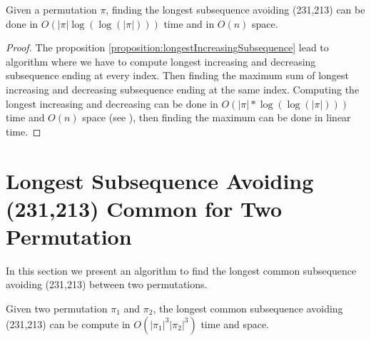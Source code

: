 \documentclass[a4paper]{llncs}
\newcommand{\ptext}{\pi}
\newcounter{num}
\begin{document}
	\begin{proposition}
	Given a permutation $\pi$,
	finding the longest subsequence avoiding (231,213)
	can be done in $O(|\ptext|\log(\log(|\ptext|)))$ time and in $O(n)$ space.
	\end{proposition}

	\begin{proof}
	The proposition \ref{proposition:longestIncreasingSubsequence} lead to algorithm
	where we have to compute longest increasing and decreasing subsequence ending at every index. Then finding the maximum sum of longest increasing and decreasing subsequence ending at the same index.
	Computing the longest increasing and decreasing can be done in $O(|\ptext|*\log(\log(|\ptext|)))$ time and $O(n)$ space (see \cite{Bespamyatnikh00enumeratinglongest}), then finding the maximum can be done in linear time.
	\end{proof}


\section{Longest Subsequence Avoiding \\(231,213) Common for Two Permutation}
\label{section:LCS common 2 permutations}

In this section we present an algorithm to find
the longest common subsequence avoiding (231,213)
between two permutations.\\

\begin{proposition}
Given two permutation $\pi_1$ and $\pi_2$,
the longest common subsequence
avoiding (231,213) can be compute in $O(|\pi_1|^3|\pi_2|^3)$ time and space.
\end{proposition}
\end{document}
